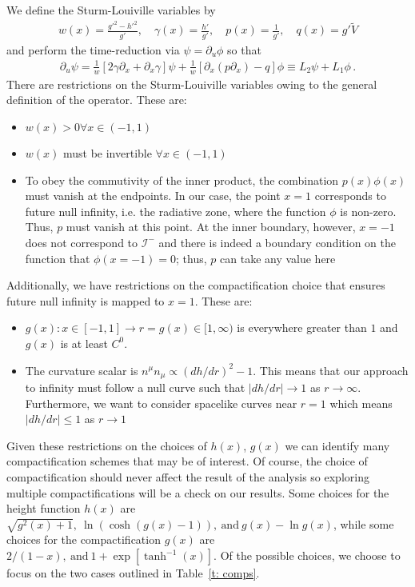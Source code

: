 \documentclass[11pt,letterpaper]{article}
\newcommand{\p}{\partial}
\begin{document}
We define the Sturm-Louiville variables by
	\begin{align}
		w(x) = \frac{g'^2-h'^2}{g'}, \quad \gamma(x) = \frac{h'}{g'}, \quad p(x) = \frac{1}{g'}, \quad q(x) = g' \tilde V
	\end{align}
and perform the time-reduction via $\psi = \p_u \phi$ so that
	\begin{align}
		\p_u \psi = \frac{1}{w} \left[2 \gamma \p_x + \p_x \gamma \right] \psi + \frac{1}{w} \left[\p_x(p \p_x) - q \right] \phi \equiv L_2 \psi + L_1 \phi \, .
	\end{align}
There are restrictions on the Sturm-Louiville variables owing to the general definition of the operator. These are:
\begin{itemize}
	\item $w(x) > 0 \forall x \in (-1,1)$
	\item $w(x)$ must be invertible $\forall x \in (-1,1)$
	\item To obey the commutivity of the inner product, the combination $p(x) \phi(x)$ must vanish at the endpoints. In our case, the point $x=1$ corresponds to future null infinity, i.e. the radiative zone, where the function $\phi$ is non-zero. Thus, $p$ must vanish at this point. At the inner boundary, however, $x = -1$ does not correspond to $\mathscr{I}^-$ and there is indeed a boundary condition on the function that $\phi(x=-1)=0$; thus, $p$ can take any value here
\end{itemize}
Additionally, we have restrictions on the compactification choice that ensures future null infinity is mapped to $x=1$. These are:
\begin{itemize}
	\item $g(x): x \in [-1,1] \to r = g(x) \in [1,\infty)$ is everywhere greater than $1$ and $g(x)$ is at least $C^0$.
	\item The curvature scalar is $n^\mu n_\mu \propto (dh/dr)^2 - 1$. This means that our approach to infinity must follow a null curve such that $|dh/dr| \to 1$ as $r \to \infty$. Furthermore, we want to consider spacelike curves near $r = 1$ which means $|dh/dr| \leq 1$ as $r \to 1$
\end{itemize}

Given these restrictions on the choices of $h(x)$, $g(x)$ we can identify many compactification schemes that may be of interest. Of course, the choice of compactification should never affect the result of the analysis so exploring multiple compactifications will be a check on our results. Some choices for the height function $h(x)$ are ${\sqrt{g^2(x) + 1},~ \ln(\cosh(g(x) - 1)),~\text{and} ~ g(x) - \ln g(x)}$, while some choices for the compactification $g(x)$ are ${ 2/(1-x),~\text{and} ~1 + \exp\left[\tanh^{-1}(x)\right]}$. Of the possible choices, we choose to focus on the two cases outlined in Table~\ref{t: comps}.
\end{document}
